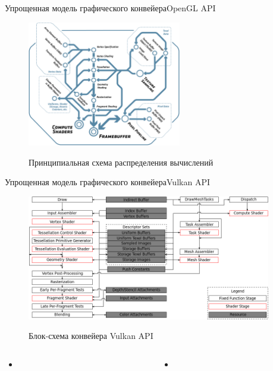 \documentclass{beamer}
\begin{document}
\begin{frame}{Упрощенная модель графического конвейера}{OpenGL API}
	\begin{figure}
		\href{https://registry.khronos.org/OpenGL/specs/gl/glspec46.core.pdf}{
			\includegraphics[width=0.6\textwidth]{images/OpenGL_specification_graphics_pipeline.png}}
		\caption {Принципиальная схема распределения вычислений}
	\end{figure}

	\note {

	}
\end{frame}

\begin{frame}{Упрощенная модель графического конвейера}{Vulkan API}
	\begin{figure}
		\href{https://docs.vulkan.org/spec/latest/chapters/pipelines.html}{
			\includegraphics[width=0.95\textwidth]{images/Vulkan_pipelinemesh.png}}
		\caption {Блок-схема конвейера Vulkan API}
	\end{figure}

	\note {


	}
\end{frame}

	\begin{columns}

		\begin{column}{0.5\textwidth}
			\begin{itemize}
				\item

			\end{itemize}
		\end{column}
		\begin{column}{0.5\textwidth}
			\begin{itemize}
				\item
			\end{itemize}
		\end{column}

	\end{columns}
\fi
\end{document}
